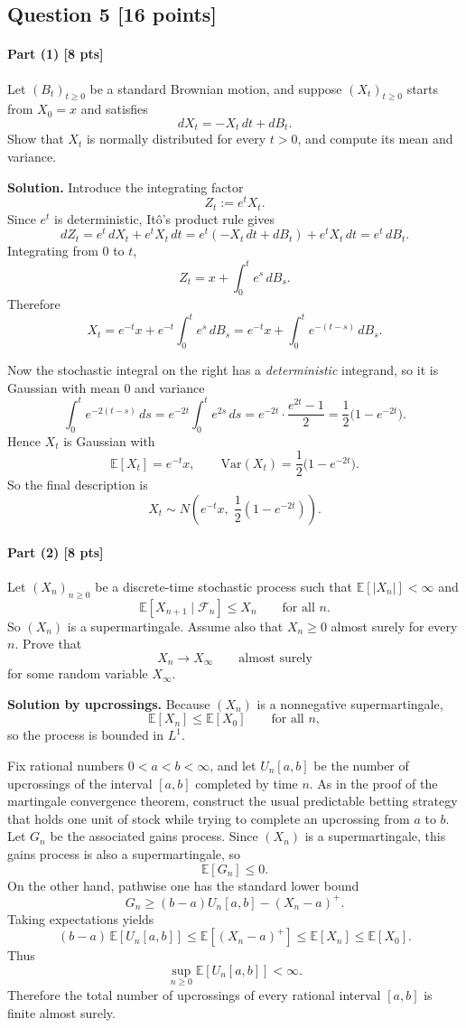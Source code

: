 \documentclass[11pt]{article}
\theoremstyle{definition}
\begin{document}
\subsection*{Question 5 \hfill [16 points]}

\paragraph{Part (1) \hfill [8 pts]}
Let \((B_t)_{t\ge 0}\) be a standard Brownian motion, and suppose \((X_t)_{t\ge 0}\) starts from \(X_0=x\) and satisfies
\[
dX_t=-X_t\,dt+dB_t.
\]
Show that \(X_t\) is normally distributed for every \(t>0\), and compute its mean and variance.

\textbf{Solution.}
Introduce the integrating factor
\[
Z_t:=e^t X_t.
\]
Since \(e^t\) is deterministic, It\^o's product rule gives
\[
dZ_t=e^t\,dX_t+e^tX_t\,dt=e^t(-X_t\,dt+dB_t)+e^tX_t\,dt=e^t\,dB_t.
\]
Integrating from \(0\) to \(t\),
\[
Z_t=x+\int_0^t e^s\,dB_s.
\]
Therefore
\[
X_t=e^{-t}x+e^{-t}\int_0^t e^s\,dB_s
=e^{-t}x+\int_0^t e^{-(t-s)}\,dB_s.
\]

Now the stochastic integral on the right has a \emph{deterministic} integrand, so it is Gaussian with mean \(0\) and variance
\[
\int_0^t e^{-2(t-s)}\,ds
=e^{-2t}\int_0^t e^{2s}\,ds
=e^{-2t}\cdot \frac{e^{2t}-1}{2}
=
\frac12\bigl(1-e^{-2t}\bigr).
\]
Hence \(X_t\) is Gaussian with
\[
\mathbb E[X_t]=e^{-t}x,
\qquad
\mathrm{Var}(X_t)=\frac12\bigl(1-e^{-2t}\bigr).
\]
So the final description is
\[
X_t\sim N\!\left(e^{-t}x,\; \frac12(1-e^{-2t})\right).
\]

\paragraph{Part (2) \hfill [8 pts]}
Let \((X_n)_{n\ge 0}\) be a discrete-time stochastic process such that \(\mathbb E[|X_n|]<\infty\) and
\[
\mathbb E[X_{n+1}\mid \mathcal F_n]\le X_n
\qquad \text{for all } n.
\]
So \((X_n)\) is a supermartingale. Assume also that \(X_n\ge 0\) almost surely for every \(n\). Prove that
\[
X_n\to X_\infty \qquad \text{almost surely}
\]
for some random variable \(X_\infty\).

\textbf{Solution by upcrossings.}
Because \((X_n)\) is a nonnegative supermartingale,
\[
\mathbb E[X_n]\le \mathbb E[X_0]\qquad \text{for all } n,
\]
so the process is bounded in \(L^1\).

Fix rational numbers \(0<a<b<\infty\), and let \(U_n[a,b]\) be the number of upcrossings of the interval \([a,b]\) completed by time \(n\). As in the proof of the martingale convergence theorem, construct the usual predictable betting strategy that holds one unit of stock while trying to complete an upcrossing from \(a\) to \(b\). Let \(G_n\) be the associated gains process. Since \((X_n)\) is a supermartingale, this gains process is also a supermartingale, so
\[
\mathbb E[G_n]\le 0.
\]
On the other hand, pathwise one has the standard lower bound
\[
G_n\ge (b-a)U_n[a,b]-(X_n-a)^+.
\]
Taking expectations yields
\[
(b-a)\,\mathbb E[U_n[a,b]]
\le
\mathbb E[(X_n-a)^+]
\le
\mathbb E[X_n]
\le
\mathbb E[X_0].
\]
Thus
\[
\sup_{n\ge 0}\mathbb E[U_n[a,b]]<\infty.
\]
Therefore the total number of upcrossings of every rational interval \([a,b]\) is finite almost surely.
\end{document}
